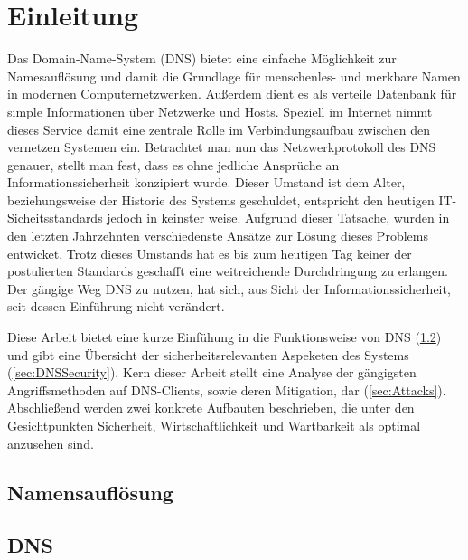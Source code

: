 \chapter{Einleitung}
Das Domain-Name-System (DNS) bietet eine einfache Möglichkeit zur Namesauflösung und damit die Grundlage für menschenles- und merkbare Namen in modernen Computernetzwerken. Außerdem dient es als verteile Datenbank für simple Informationen über Netzwerke und Hosts. Speziell im Internet nimmt dieses Service damit eine zentrale Rolle im Verbindungsaufbau zwischen den vernetzen Systemen ein. Betrachtet man nun das Netzwerkprotokoll des DNS genauer, stellt man fest, dass es ohne jedliche Ansprüche an Informationssicherheit konzipiert wurde. Dieser Umstand ist dem Alter, beziehungsweise der Historie des Systems geschuldet, entspricht den heutigen IT-Sicheitsstandards jedoch in keinster weise. Aufgrund dieser Tatsache, wurden in den letzten Jahrzehnten verschiedenste Ansätze zur Lösung dieses Problems entwicket. Trotz dieses Umstands hat es bis zum heutigen Tag keiner der postulierten Standards geschafft eine weitreichende Durchdringung zu erlangen. Der gängige Weg DNS zu nutzen, hat sich, aus Sicht der Informationssicherheit, seit dessen Einführung nicht verändert.


Diese Arbeit bietet eine kurze Einfühung in die Funktionsweise von DNS (\ref{sec:DNS}) und gibt eine Übersicht der sicherheitsrelevanten Aspeketen des Systems (\ref{sec:DNSSecurity}). Kern dieser Arbeit stellt eine Analyse der gängigsten Angriffsmethoden auf DNS-Clients, sowie deren Mitigation, dar (\ref{sec:Attacks}). Abschließend werden zwei konkrete Aufbauten beschrieben, die unter den Gesichtpunkten Sicherheit, Wirtschaftlichkeit und Wartbarkeit als optimal anzusehen sind. 

\section{Namensauflösung}

\section{DNS}
\label{sec:DNS}

